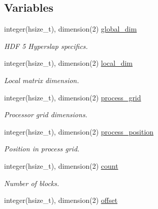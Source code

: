 \subsection*{Variables}
\begin{DoxyCompactItemize}
\item 
integer(hsize\+\_\+t), dimension(2) \hyperlink{namespacehdf5__tools_afb5abe163ca047dcd5bd1cd1b3f6c1c9}{global\+\_\+dim}
\begin{DoxyCompactList}\small\item\em H\+D\+F 5 Hyperslap specifics. \end{DoxyCompactList}\item 
\hypertarget{namespacehdf5__tools_af164a6df3cb05268f73997ffa3ea9995}{}integer(hsize\+\_\+t), dimension(2) \hyperlink{namespacehdf5__tools_af164a6df3cb05268f73997ffa3ea9995}{local\+\_\+dim}\label{namespacehdf5__tools_af164a6df3cb05268f73997ffa3ea9995}

\begin{DoxyCompactList}\small\item\em Local matrix dimension. \end{DoxyCompactList}\item 
\hypertarget{namespacehdf5__tools_ab6418c08de7ce2dbdb5b625efb2d708b}{}integer(hsize\+\_\+t), dimension(2) \hyperlink{namespacehdf5__tools_ab6418c08de7ce2dbdb5b625efb2d708b}{process\+\_\+grid}\label{namespacehdf5__tools_ab6418c08de7ce2dbdb5b625efb2d708b}

\begin{DoxyCompactList}\small\item\em Processor grid dimensions. \end{DoxyCompactList}\item 
\hypertarget{namespacehdf5__tools_af580e894b15191f462b034023d07c3b3}{}integer(hsize\+\_\+t), dimension(2) \hyperlink{namespacehdf5__tools_af580e894b15191f462b034023d07c3b3}{process\+\_\+position}\label{namespacehdf5__tools_af580e894b15191f462b034023d07c3b3}

\begin{DoxyCompactList}\small\item\em Position in process grid. \end{DoxyCompactList}\item 
\hypertarget{namespacehdf5__tools_ab0fa929a10c9118648f7c316033e2fd9}{}integer(hsize\+\_\+t), dimension(2) \hyperlink{namespacehdf5__tools_ab0fa929a10c9118648f7c316033e2fd9}{count}\label{namespacehdf5__tools_ab0fa929a10c9118648f7c316033e2fd9}

\begin{DoxyCompactList}\small\item\em Number of blocks. \end{DoxyCompactList}\item 
\hypertarget{namespacehdf5__tools_ade157e8bd266c4206b2ca7f57e37de8c}{}integer(hsize\+\_\+t), dimension(2) \hyperlink{namespacehdf5__tools_ade157e8bd266c4206b2ca7f57e37de8c}{offset}\label{namespacehdf5__tools_ade157e8bd266c4206b2ca7f57e37de8c}


\end{DoxyCompactItemize}
